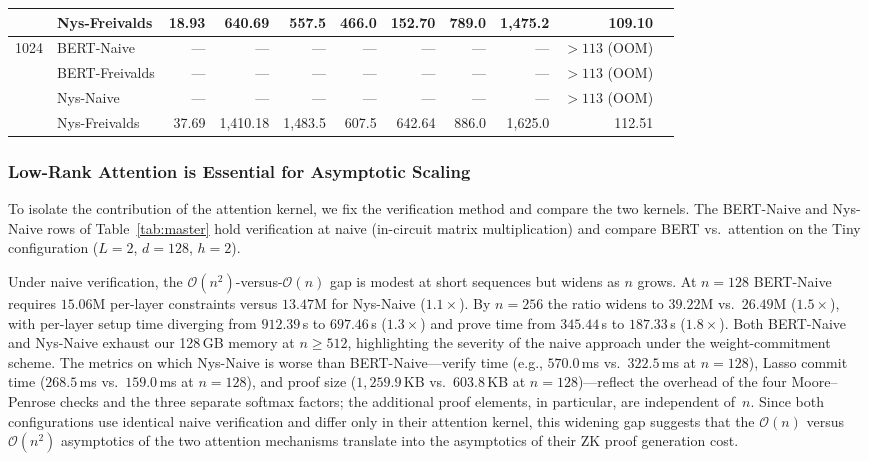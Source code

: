 \documentclass[sigconf,anonymous,review,balance=false]{acmart}
\newcommand{\rev}[1]{{\color{magenta}#1}}
\begin{document}
\begin{table}[!ht]
\begin{tabular}{@{} cl rrrrrrrrr @{}}
  & Nys-Freivalds  & 18.93 & 640.69 & 557.5 & 466.0 & 152.70 & 789.0 & 1{,}475.2  & 109.10 \\
\midrule
\multirow{4}{*}{1024}
  & BERT-Naive     & ---   & ---    & ---   & ---   & ---    & ---   & ---        & ${>}113$ (OOM) \\
  & BERT-Freivalds & ---   & ---    & ---   & ---   & ---    & ---   & ---        & ${>}113$ (OOM) \\
  & Nys-Naive      & ---   & ---    & ---   & ---   & ---    & ---   & ---        & ${>}113$ (OOM) \\
  & Nys-Freivalds  & 37.69 & 1{,}410.18 & 1{,}483.5 & 607.5 & 642.64 & 886.0 & 1{,}625.0  & 112.51 \\
\bottomrule
\end{tabular}
\end{table}

\subsubsection{Low-Rank Attention is Essential for Asymptotic Scaling}
\label{subsec:lowrank-essential}
To isolate the contribution of the attention kernel, we fix the verification method and compare the two kernels.
The BERT-Naive and Nys-Naive rows of Table~\ref{tab:master} hold verification at naive (in-circuit matrix multiplication) and compare BERT vs.\ \nystrom attention on the Tiny configuration ($L{=}2$, $d{=}128$, $h{=}2$).

Under naive verification, the $\mathcal{O}(n^2)$-versus-$\mathcal{O}(n)$ gap is modest at short sequences but widens as $n$ grows. At $n{=}128$ \rev{BERT-Naive} requires $15.06$M per-layer constraints versus $13.47$M for \rev{Nys-Naive} ($1.1{\times}$). By $n{=}256$ the ratio widens to $39.22$M vs.\ $26.49$M ($1.5{\times}$), with per-layer setup time diverging from \rev{$912.39$}\,s to \rev{$697.46$}\,s ($1.3{\times}$) and prove time from \rev{$345.44$}\,s to \rev{$187.33$}\,s ($1.8{\times}$). Both \rev{BERT-Naive} and \rev{Nys-Naive} exhaust our 128\,GB memory at $n{\geq}512$, highlighting the severity of the naive approach under the weight-commitment scheme. \rev{The metrics on which Nys-Naive is worse than BERT-Naive---verify time (e.g., $570.0$\,ms vs.\ $322.5$\,ms at $n{=}128$), Lasso commit time ($268.5$\,ms vs.\ $159.0$\,ms at $n{=}128$), and proof size ($1{,}259.9$\,KB vs.\ $603.8$\,KB at $n{=}128$)---reflect the overhead of the four Moore--Penrose checks and the three separate softmax factors; \rev{the additional proof elements}, in particular, \rev{are} independent of~$n$.} Since both configurations use identical naive verification and differ only in their attention kernel, this widening gap suggests that the $\mathcal{O}(n)$ versus $\mathcal{O}(n^2)$ asymptotics of the two attention mechanisms translate into the asymptotics of their ZK proof generation cost.
\end{document}
